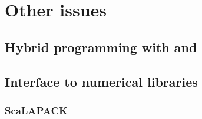 \chapter{Other issues}

\section{Hybrid programming with \MPI and \OMP}

\subsection{\MPI}

\subsection{\OMP}

\section{Interface to numerical libraries}

\subsection{ScaLAPACK}


